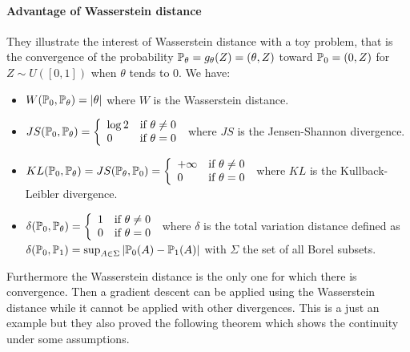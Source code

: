 \paragraph{Advantage of Wasserstein distance}
They illustrate the interest of Wasserstein distance with a toy problem,
that is the convergence of the probability $\mathbb{P}_\theta = g_\theta(Z) =
(\theta, Z)$ toward $\mathbb{P}_0 = (0, Z)$ for $Z \sim U([0, 1])$ when $\theta$
tends to 0. We have:
\begin{itemize}
	\item $W(\mathbb{P}_0, \mathbb{P}_\theta) = | \theta |$ where $W$ is the Wasserstein distance.
	\item $JS(\mathbb{P}_0, \mathbb{P}_\theta) = \left\{ \begin{array}{ll}
			\log 2 & \text{if } \theta \neq 0 \\
			0 & \text{if } \theta = 0
		\end{array} \right.$ where $JS$ is the Jensen-Shannon divergence.
	\item $KL(\mathbb{P}_0, \mathbb{P}_\theta) = JS(\mathbb{P}_\theta, \mathbb{P}_0) = \left\{ \begin{array}{ll}
			+ \infty & \text{if } \theta \neq 0 \\
			0 & \text{if } \theta = 0
		\end{array} \right.$ where $KL$ is the Kullback-Leibler divergence.
	\item $\delta(\mathbb{P}_0, \mathbb{P}_\theta) = \left\{ \begin{array}{ll}
			1 & \text{if } \theta \neq 0 \\
			0 & \text{if } \theta = 0
		\end{array} \right.$ where $\delta$ is the total variation distance defined as \\ $\delta(\mathbb{P}_0, \mathbb{P}_1) = \sup_{A \in \Sigma} | \mathbb{P}_0(A) - \mathbb{P}_1(A) |$ with $\Sigma$ the set of all Borel subsets.
\end{itemize}

Furthermore the Wasserstein distance is the only one for which there is
convergence. Then a gradient descent can be applied using the Wasserstein
distance while it cannot be applied with other divergences. This is a just an
example but they also proved the following theorem which shows the continuity
under some assumptions.

